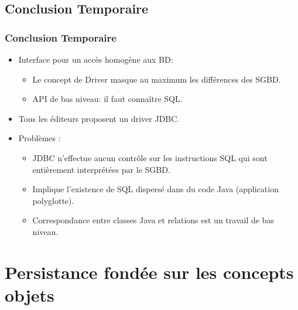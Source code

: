 \documentclass[xcolor=pdftex,x11names,table]{beamer}
\begin{document}
		
		\subsection{Conclusion Temporaire}
    \begin{frame}
    \frametitle{Conclusion Temporaire}
    	\begin{itemize}
				\item Interface pour un accès homogène aux BD:
					\begin{itemize}
						\item Le concept de Driver masque au maximum les différences des SGBD.
						\item API de bas niveau: il faut connaître SQL.
					\end{itemize}
				\item Tous les éditeurs proposent un driver JDBC.
				\item Problèmes :
					\begin{itemize}
						\item JDBC n'effectue aucun contrôle sur les instructions SQL qui sont entièrement interprétées par le SGBD.
						\item Implique l'existence de SQL dispersé dans du code Java (application polyglotte).
						\item Correspondance entre classes Java et relations est un travail de bas niveau.
					\end{itemize}
			\end{itemize}
    \end{frame}
        
  \section{Persistance fondée sur les concepts objets}
  
\end{document}
